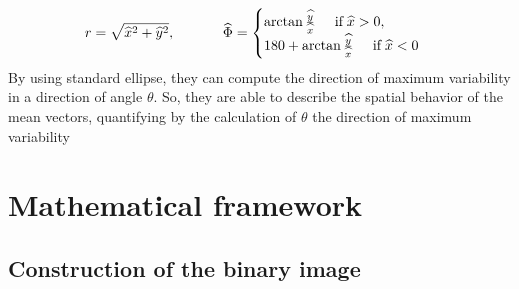 \documentclass[12pt]{article}
\renewcommand{\hat}{\widehat}
\theoremstyle{Theorem}
\theoremstyle{definition}
\begin{document}
\begin{equation*}
r=\sqrt{\hat{x}^{2} + \hat{y}^{2}}, \; \hspace{1cm} \; \hat{\Phi} = \begin{cases} \arctan{\frac{\hat{y}}{\hat{x}}} \hspace{0.5cm} \text{if} \; \hat{x} > 0 , \\
180 + \arctan{\frac{\hat{y}}{\hat{x}}} \hspace{0.5cm} \text{if} \; \hat{x} < 0 
\end{cases}
\end{equation*}
By using standard ellipse, they can compute the direction of maximum variability in a direction of angle $\theta$. So, they are able to describe the spatial behavior of the mean vectors, quantifying by the calculation of $\theta$ the direction of maximum variability
\section{Mathematical framework}\label{section1}
\subsection{Construction of the binary image}\label{construction}
\end{document}
